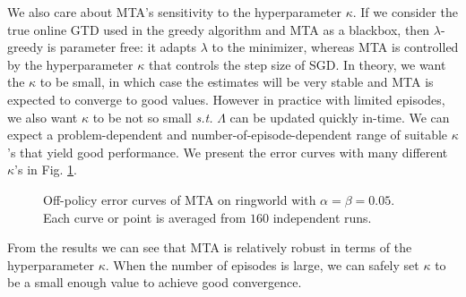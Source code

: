 \documentclass{article}
\newcommand\st{\textit{s.t.}}
\begin{document}
We also care about MTA's sensitivity to the hyperparameter $\kappa$. If we consider the true online GTD used in the greedy algorithm and MTA as a blackbox, then $\lambda$-greedy is parameter free: it adapts $\lambda$ to the minimizer, whereas MTA is controlled by the hyperparameter $\kappa$ that controls the step size of SGD. In theory, we want the $\kappa$ to be small, in which case the estimates will be very stable and MTA is expected to converge to good values. However in practice with limited episodes, we also want $\kappa$ to be not so small \st{} $\Lambda$ can be updated quickly in-time. We can expect a problem-dependent and number-of-episode-dependent range of suitable $\kappa$'s that yield good performance. We present the error curves with many different $\kappa$'s in Fig. \ref{fig:ringworld_sensitivity}.
\begin{figure}
\centering
\begin{adjustwidth}{-1in}{-1in}
\hfill
{}
\end{adjustwidth}
\caption{\small Off-policy error curves of MTA on ringworld with $\alpha = \beta = 0.05$. Each curve or point is averaged from $160$ independent runs.}
\label{fig:ringworld_sensitivity}
\end{figure}
\par
From the results we can see that MTA is relatively robust in terms of the hyperparameter $\kappa$. When the number of episodes is large, we can safely set $\kappa$ to be a small enough value to achieve good convergence.
\end{document}
